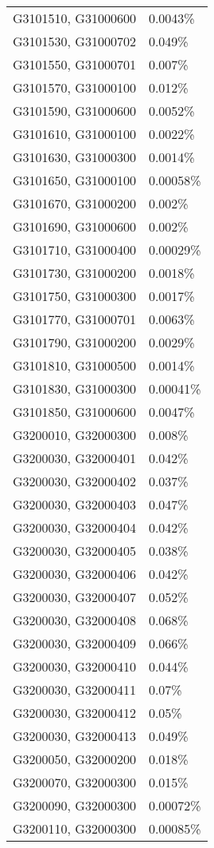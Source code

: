 \begin{longtable}[]{@{}ll@{}}
G3101510, G31000600 & 0.0043\% \\
G3101530, G31000702 & 0.049\% \\
G3101550, G31000701 & 0.007\% \\
G3101570, G31000100 & 0.012\% \\
G3101590, G31000600 & 0.0052\% \\
G3101610, G31000100 & 0.0022\% \\
G3101630, G31000300 & 0.0014\% \\
G3101650, G31000100 & 0.00058\% \\
G3101670, G31000200 & 0.002\% \\
G3101690, G31000600 & 0.002\% \\
G3101710, G31000400 & 0.00029\% \\
G3101730, G31000200 & 0.0018\% \\
G3101750, G31000300 & 0.0017\% \\
G3101770, G31000701 & 0.0063\% \\
G3101790, G31000200 & 0.0029\% \\
G3101810, G31000500 & 0.0014\% \\
G3101830, G31000300 & 0.00041\% \\
G3101850, G31000600 & 0.0047\% \\
G3200010, G32000300 & 0.008\% \\
G3200030, G32000401 & 0.042\% \\
G3200030, G32000402 & 0.037\% \\
G3200030, G32000403 & 0.047\% \\
G3200030, G32000404 & 0.042\% \\
G3200030, G32000405 & 0.038\% \\
G3200030, G32000406 & 0.042\% \\
G3200030, G32000407 & 0.052\% \\
G3200030, G32000408 & 0.068\% \\
G3200030, G32000409 & 0.066\% \\
G3200030, G32000410 & 0.044\% \\
G3200030, G32000411 & 0.07\% \\
G3200030, G32000412 & 0.05\% \\
G3200030, G32000413 & 0.049\% \\
G3200050, G32000200 & 0.018\% \\
G3200070, G32000300 & 0.015\% \\
G3200090, G32000300 & 0.00072\% \\
G3200110, G32000300 & 0.00085\% \\

\end{longtable}
